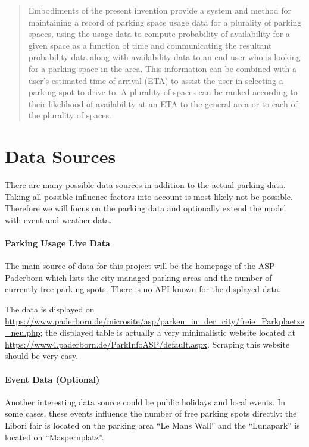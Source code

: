 \documentclass[journal,10pt]{IEEEtran}
\begin{document}
\begin{quote}
  Embodiments of the present invention provide a system and method for maintaining a record of parking space usage data for a plurality of parking spaces, using the usage data to compute probability of availability for a given space as a function of time and communicating the resultant probability data along with availability data to an end user who is looking for a parking space in the area. This information can be combined with a user's estimated time of arrival (ETA) to assist the user in selecting a parking spot to drive to. A plurality of spaces can be ranked according to their likelihood of availability at an ETA to the general area or to each of the plurality of spaces.
  \cite{quinn2008}
\end{quote}

\section{Data Sources}\label{data sources}
There are many possible data sources in addition to the actual parking data. Taking all possible influence factors into account is most likely not be possible. Therefore we will focus on the parking data and optionally extend the model with event and weather data.

\paragraph{Parking Usage Live Data}
The main source of data for this project will be the homepage of the ASP Paderborn which lists the city managed parking areas and the number of currently free parking spots. There is no API known for the displayed data. 

The data is displayed on \url{https://www.paderborn.de/microsite/asp/parken_in_der_city/freie_Parkplaetze_neu.php}; the displayed table is actually a very minimalistic website located at \url{https://www4.paderborn.de/ParkInfoASP/default.aspx}. Scraping this website should be very easy.

\paragraph{Event Data (Optional)}
Another interesting data source could be public holidays and local events. In some cases, these events influence the number of free parking spots directly: the Libori fair is located on the parking area ``Le Mans Wall'' and the ``Lunapark'' is located on ``Maspernplatz''. 
\end{document}
